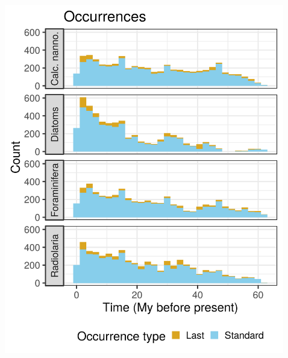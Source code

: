 \documentclass[aspectratio=169]{beamer}
\begin{document}
\begin{frame}
\begin{columns}
\begin{column}{0.1\textwidth}
\begin{center}
      \end{center}
    \end{column}
    \begin{column}{0.4\textwidth}
      \includegraphics[width=\textwidth,height=0.7\textheight,keepaspectratio=true]{../results/figure/occ_time_label_full}
    \end{column}
    \begin{column}{0.4\textwidth}

\end{column}
\end{columns}
\end{frame}
\end{document}

